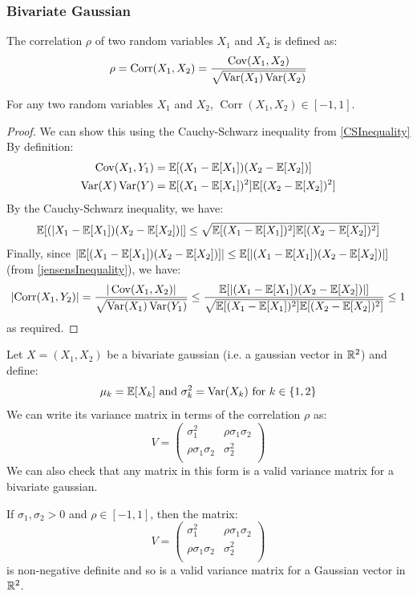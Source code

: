 \documentclass[../main.tex]{subfiles}
\begin{document}
\subsubsection{Bivariate Gaussian}
\begin{definition}[Correlation]
  The correlation $\rho$ of two random variables $X_1$ and $X_2$ is defined as:
  \[
    \rho = \operatorname{Corr}(X_1, X_2) = \frac{\operatorname{Cov}(X_1, X_2)}{\sqrt{\operatorname{Var}(X_1)\operatorname{Var}(X_2)}}
  \]
\end{definition}
\begin{lemma}
  For any two random variables $X_1$ and $X_2$,  $\operatorname{Corr}(X_1, X_2) \in [-1, 1]$.
\end{lemma}
\begin{proof}
  We can show this using the Cauchy-Schwarz inequality from \cref{CSInequality}
  By definition:
  \begin{align*}
    \operatorname{Cov}(X_1, Y_1) &= \mathbb{E}[(X_1 - \mathbb{E}[X_1])(X_2 - \mathbb{E}[X_2])] \\
    \operatorname{Var}(X)\operatorname{Var}(Y) &= \mathbb{E}[(X_1 - \mathbb{E}[X_1])^2]\mathbb{E}[(X_2 - \mathbb{E}[X_2])^2]
  \end{align*}
  By the Cauchy-Schwarz inequality, we have:
  \[
    \mathbb{E}[(|X_1 - \mathbb{E}[X_1])(X_2 - \mathbb{E}[X_2])|] \leq \sqrt{\mathbb{E}[(X_1 - \mathbb{E}[X_1])^2]\mathbb{E}[(X_2 - \mathbb{E}[X_2])^2]}
  \]
  Finally, since $|\mathbb{E}[(X_1 - \mathbb{E}[X_1])(X_2 - \mathbb{E}[X_2])]| \leq \mathbb{E}[|(X_1 - \mathbb{E}[X_1])(X_2 - \mathbb{E}[X_2])|]$ (from \cref{jensensInequality}), we have:
  \[
    \left\lvert \operatorname{Corr}(X_1, Y_2) \right\rvert = \frac{|\operatorname{Cov}(X_1, X_2)|}{\sqrt{\operatorname{Var}(X_1)\operatorname{Var}(Y_1)}} \leq \frac{\mathbb{E}[|(X_1 - \mathbb{E}[X_1])(X_2 - \mathbb{E}[X_2])|]}{\sqrt{\mathbb{E}[(X_1 - \mathbb{E}[X_1])^2]\mathbb{E}[(X_2 - \mathbb{E}[X_2])^2]}} \leq 1
  \]
  as required.
\end{proof}
Let $X = (X_1, X_2)$ be a bivariate gaussian (i.e. a gaussian vector in $\mathbb{R}^2$) and define:
\[
  \mu_k = \mathbb{E}[X_k] \text{ and } \sigma_k^2 = \operatorname{Var}(X_k) \text{ for }k \in  \{1, 2\}
\]
We can write its variance matrix in terms of the correlation $\rho$ as:
\[
  V = \begin{pmatrix}
  \sigma^2_1 & \rho\sigma_1\sigma_2 \\
  \rho\sigma_1\sigma_2 & \sigma^2_2 \\
  \end{pmatrix}
\]
We can also check that any matrix in this form is a valid variance matrix for a bivariate gaussian.
\begin{lemma}
  If $\sigma_1, \sigma_2 > 0$ and $\rho \in [-1, 1]$, then the matrix:
  \[
    V = \begin{pmatrix}
    \sigma^2_1 & \rho\sigma_1\sigma_2 \\
    \rho\sigma_1\sigma_2 & \sigma^2_2 \\
    \end{pmatrix}
  \]
  is non-negative definite and so is a valid variance matrix for a Gaussian vector in $\mathbb{R}^2$.
\end{lemma}
\end{document}
